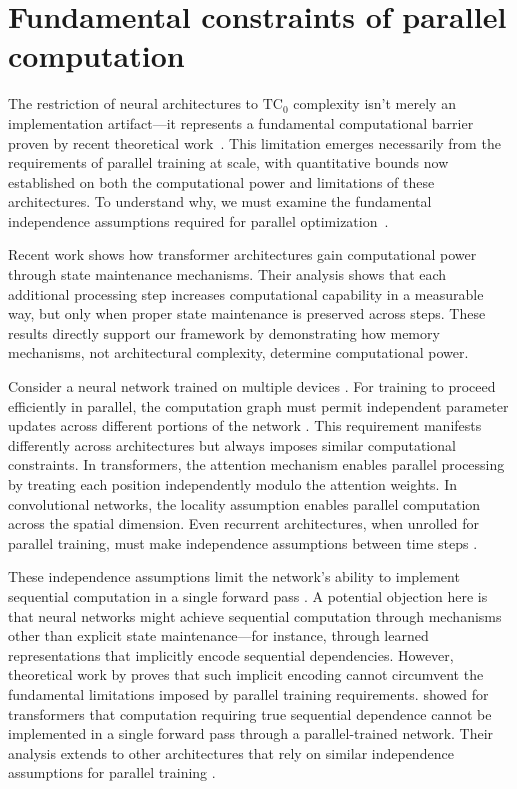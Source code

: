 \documentclass[12pt]{article}
\begin{document}
\section{Fundamental constraints of parallel computation}

The restriction of neural architectures to $\text{TC}_0$ complexity isn't merely an implementation artifact---it represents a fundamental computational barrier proven by recent theoretical work~\cite{merrill2023parallelism,peng2024limitations}.
This limitation emerges necessarily from the requirements of parallel training at scale, with quantitative bounds now established on both the computational power and limitations of these architectures.
To understand why, we must examine the fundamental independence assumptions required for parallel optimization~\cite{shallue2019measuring}.

Recent work \cite{merrill2024} shows how transformer architectures gain computational power through state maintenance mechanisms.
Their analysis shows that each additional processing step increases computational capability in a measurable way, but only when proper state maintenance is preserved across steps.
These results directly support our framework by demonstrating how memory mechanisms, not architectural complexity, determine computational power.

Consider a neural network trained on multiple devices \cite{zhao2024epha}.
For training to proceed efficiently in parallel, the computation graph must permit independent parameter updates across different portions of the network \cite{barrett2019analyzing}.
This requirement manifests differently across architectures but always imposes similar computational constraints.
In transformers, the attention mechanism enables parallel processing by treating each position independently modulo the attention weights.
In convolutional networks, the locality assumption enables parallel computation across the spatial dimension.
Even recurrent architectures, when unrolled for parallel training, must make independence assumptions between time steps \cite{dickson2023rnns}.

These independence assumptions limit the network's ability to implement sequential computation in a single forward pass \cite{wei2022chain}. A potential objection here is that neural networks might achieve sequential computation through mechanisms other than explicit state maintenance---for instance, through learned representations that implicitly encode sequential dependencies. However, theoretical work by \cite{merrill2023parallelism} proves that such implicit encoding cannot circumvent the fundamental limitations imposed by parallel training requirements.
\cite{merrill2023parallelism} showed for transformers that computation requiring true sequential dependence cannot be implemented in a single forward pass through a parallel-trained network.
Their analysis extends to other architectures that rely on similar independence assumptions for parallel training \cite{stillman2023generative}.
\end{document}
